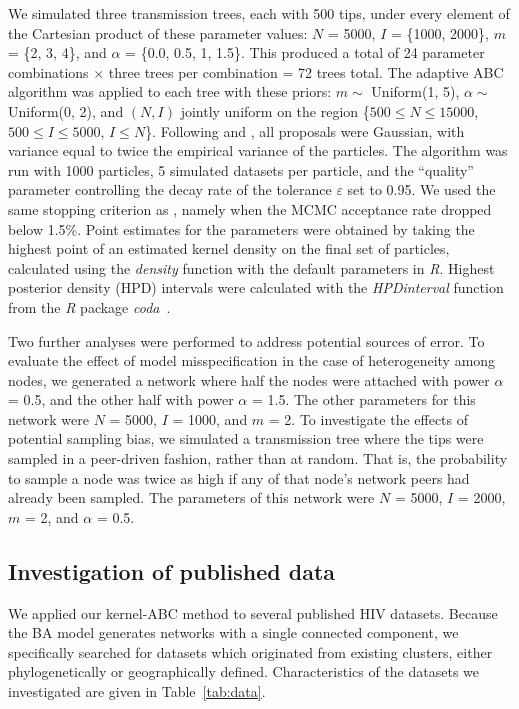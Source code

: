 \documentclass[nogrid]{MBE}
\begin{document}
We simulated three transmission trees, each with 500 tips, under every element
of the Cartesian product of these parameter values: $N$ = 5000, $I$ =
\{1000, 2000\}, $m$ = \{2, 3, 4\}, and $\alpha$ = \{0.0, 0.5, 1,
1.5\}. This produced a total of 24 parameter combinations $\times$ three trees
per combination = 72 trees total. The adaptive ABC algorithm was applied to
each tree with these priors: $m \sim$ Uniform(1, 5), $\alpha \sim$ Uniform(0,
2), and $(N, I)$ jointly uniform on the region \{$500 \leq N \leq 15000$, $500
\leq I \leq 5000$, $I \leq N$\}. Following \citet{del2012adaptive} and
\citet{beaumont2009adaptive}, all proposals were Gaussian, with variance equal
to twice the empirical variance of the particles. The algorithm was run with
1000 particles, 5 simulated datasets per particle, and the ``quality''
parameter controlling the decay rate of the tolerance $\varepsilon$ set to
0.95. We used the same stopping criterion as \citeauthor{del2012adaptive},
namely when the MCMC acceptance rate dropped below 1.5\%. Point estimates for
the parameters were obtained by taking the highest point of an estimated kernel
density on the final set of particles, calculated using the \textit{density}
function with the default parameters in \textit{R}. Highest posterior density
(HPD) intervals were calculated with the \textit{HPDinterval} function from
the \textit{R} package \textit{coda}~\citep{plummer2006coda}.
  
Two further analyses were performed to address potential sources of error. To
evaluate the effect of model misspecification in the case of heterogeneity
among nodes, we generated a network where half the nodes were attached with
power $\alpha$ = 0.5, and the other half with power $\alpha$ = 1.5. The other
parameters for this network were $N$ = 5000, $I$ = 1000, and $m$ = 2. To
investigate the effects of potential sampling bias, we simulated a transmission
tree where the tips were sampled in a peer-driven fashion, rather than at
random. That is, the probability to sample a node was twice as high if any of
that node's network peers had already been sampled. The parameters of this
network were $N$ = 5000, $I$ = 2000, $m$ = 2, and $\alpha$ = 0.5.
  
\subsection{Investigation of published data}
  
We applied our kernel-ABC method to several published HIV datasets. Because the
BA model generates networks with a single connected component, we
specifically searched for datasets which originated from existing clusters,
either phylogenetically or geographically defined. Characteristics of the
datasets we investigated are given in Table~\ref{tab:data}.
  
\end{document}
